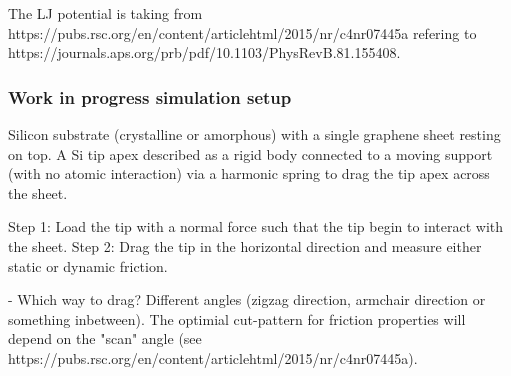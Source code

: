 The LJ potential is taking from https://pubs.rsc.org/en/content/articlehtml/2015/nr/c4nr07445a refering to https://journals.aps.org/prb/pdf/10.1103/PhysRevB.81.155408.


\subsubsection*{Work in progress simulation setup}
Silicon substrate (crystalline or amorphous) with a single graphene sheet resting on top. A Si tip apex described as a rigid body connected to a moving support (with no atomic interaction) via a harmonic spring to drag the tip apex across the sheet. \par
Step 1: Load the tip with a normal force such that the tip begin to interact with the sheet. Step 2: Drag the tip in the horizontal direction and measure either static or dynamic friction. 

- Which way to drag? Different angles (zigzag direction, armchair direction or something inbetween). The optimial cut-pattern for friction properties will depend on the "scan" angle (see https://pubs.rsc.org/en/content/articlehtml/2015/nr/c4nr07445a). 